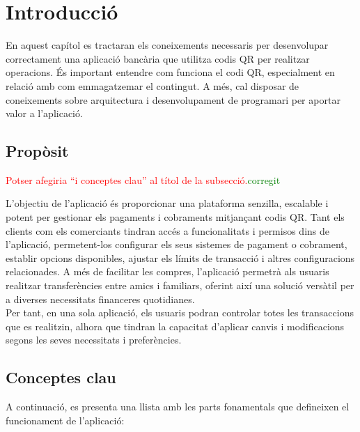 \documentclass[a4paper,12pt,twoside]{ThesisStyle}
\newcommand{\pau}[1]{\textcolor{red}{#1}}
\newcommand{\sudan}[1]{\textcolor{green}{#1}}
\begin{document}
\section{Introducció}
\label{subsec:Introducció}

En aquest capítol es tractaran els coneixements necessaris per desenvolupar correctament una aplicació bancària que utilitza codis QR per realitzar operacions. És important entendre com funciona el codi QR, especialment en relació amb com emmagatzemar el contingut. A més, cal disposar de coneixements sobre arquitectura i desenvolupament de programari per aportar valor a l'aplicació.

\subsection{Propòsit}
\label{subsec: Propòsit}

\pau{Potser afegiria ``i conceptes clau'' al títol de la subsecció.}\sudan{corregit}

L'objectiu de l'aplicació és proporcionar una plataforma senzilla, escalable i potent per gestionar els pagaments i cobraments mitjançant codis QR. Tant els clients com els comerciants tindran accés a funcionalitats i permisos dins de l'aplicació, permetent-los configurar els seus sistemes de pagament o cobrament, establir opcions disponibles, ajustar els límits de transacció i altres configuracions relacionades. A més de facilitar les compres, l'aplicació permetrà als usuaris realitzar transferències entre amics i familiars, oferint així una solució versàtil per a diverses necessitats financeres quotidianes.\\

Per tant, en una sola aplicació, els usuaris podran controlar totes les transaccions que es realitzin, alhora que tindran la capacitat d'aplicar canvis i modificacions segons les seves necessitats i preferències.\\


\subsection{Conceptes clau}
\label{subsec: Conceptes clau}

A continuació, es presenta una llista amb les parts fonamentals que defineixen el funcionament de l'aplicació:
\end{document}

